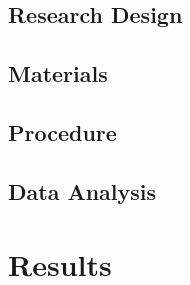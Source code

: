 \documentclass[11pt,a4paper]{article}
\begin{document}
\subsection{Research Design}

\subsection{Materials}

\subsection{Procedure}

\subsection{Data Analysis}

\section{Results}
\label{sec:results}
\end{document}
